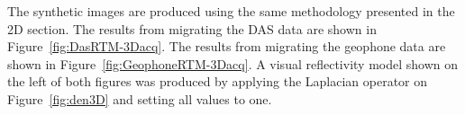 %
%
%

The synthetic images are produced using the same methodology presented in the 2D section. The results from migrating the DAS data are shown in Figure~\ref{fig:DasRTM-3Dacq}. The results from migrating the geophone data are shown in Figure~\ref{fig:GeophoneRTM-3Dacq}. A visual reflectivity model shown on the left of both figures was produced by applying the Laplacian operator on Figure~\ref{fig:den3D} and setting all values to one.

